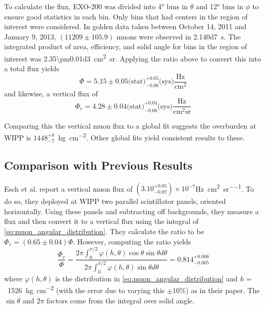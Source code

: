 \documentclass[herrin-thesis.tex]{subfiles}
\begin{document}
To calculate the flux, EXO-200 was divided into \ang{4} bins in \(\theta\) and \ang{12} bins in \(\phi\) to ensure good statistics in each bin. Only bins that had centers in the region of interest were considered. In golden data taken between October 14, 2011 and January 9, 2013, \((11209\pm105.9)\) muons were observed in \SI{2.140d7}{\second}. The integrated product of area, efficiency, and solid angle for bins in the region of interest was \SI{2.35\pm0.01d3}{\square\cm\steradian}. Applying the ratio above to convert this into a total flux yields
\begin{equation}
\label{eq:muon_flux_result}
\Phi = 5.15\pm0.05\text{(stat)}^{+0.05}_{-0.06}\text{(sys)}\frac{\text{Hz}}{\text{cm}^2}
\end{equation}
and likewise, a vertical flux of
\begin{equation}
\label{eq:muon_vflux_result}
\Phi_v = 4.28\pm0.04\text{(stat)}^{+0.04}_{-0.06}\text{(sys)}\frac{\text{Hz}}{\text{cm}^2\text{sr}}
\end{equation}

Comparing this the vertical muon flux to a global fit\cite{Mei:2006qy} suggests the overburden at WIPP is \(1448^{+8}_{-7}\)~\si{\hecto\g\per\square\cm}. Other global fits\cite{Crouch:1987ij}\cite{miyake:1973} yield consistent results to these.

\subsection{Comparison with Previous Results}
Esch et al.\cite{Esch:2004zj} report a vertical muon flux of \((3.10^{+0.05}_{-0.07})\times10^{-7}\)\si{\Hz\per\square\cm\per\steradian}. To do so, they deployed at WIPP two parallel scintillator panels, oriented horizontally. Using these panels and subtracting off backgrounds, they measure a flux and then convert it to a vertical flux using the integral of \cref{eq:muon_angular_distribution}. They calculate the ratio to be \(\Phi_v = (0.65\pm0.04)\Phi\). However, computing the ratio yields 
\begin{equation}
\label{eq:muon_esch_integral}
\frac{\Phi_v}{\Phi} = \frac{2 \pi \int_0^{\pi/2} \varphi(h,\theta)\cos\theta\sin\theta d\theta}{2 \pi \int_0^{\pi/2} \varphi(h,\theta)\sin\theta d\theta} = 0.814^{+0.006}_{-0.005}
\end{equation}
where \(\varphi(h,\theta)\) is the distribution in \cref{eq:muon_angular_distribution} and \(h = \)~\SI{1526}{\hecto\gram\per\square\cm} (with the error due to varying this \(\pm10\%\)) as in their paper. The \(\sin\theta\) and \(2 \pi\) factors come from the integral over solid angle.
\end{document}
